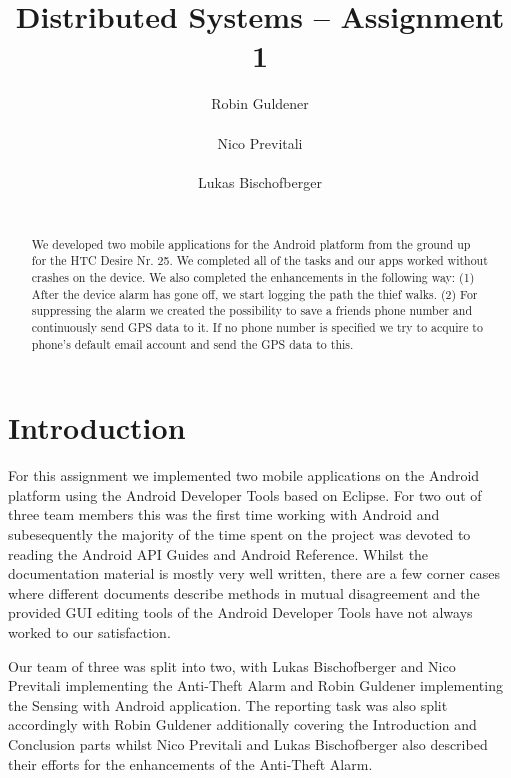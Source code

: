 \documentclass{report}
\title{Distributed Systems -- Assignment 1}
\author{
%
%
\alignauthor Robin Guldener\\
	\affaddr{ETH ID 11-930-369}\\
	\email{robing@student.ethz.ch}
\alignauthor Nico Previtali\\
	\affaddr{ETH ID 11-926-433}\\
	\email{pnico@student.ethz.ch}
\alignauthor Lukas Bischofberger\\
	\affaddr{ETH ID 11-915-907}\\
	\email{lukasbi@student.ethz.ch}
}
\begin{document}
\maketitle

\begin{abstract}

We developed two mobile applications for the Android platform from the ground up for the HTC Desire Nr. 25. We completed all of the tasks and our apps worked without crashes on the device. We also completed the enhancements in the following way: (1) After the device alarm has gone off, we start logging the path the thief walks. (2) For suppressing the alarm we created the possibility to save a friends phone number and continuously send GPS data to it. If no phone number is specified we try to acquire to phone's default email account and send the GPS data to this.

\end{abstract}

\section{Introduction}

For this assignment we implemented two mobile applications on the Android platform using the Android Developer Tools based on Eclipse\cite{androidDevTools}. For two out of three team members this was the first time working with Android and subesequently the majority of the time spent on the project was devoted to reading the Android API Guides\cite{androidAPIGuides} and Android Reference\cite{androidAPIReference}. Whilst the documentation material is mostly very well written, there are a few corner cases where different documents describe methods in mutual disagreement and the provided GUI editing tools of the Android Developer Tools have not always worked to our satisfaction.

Our team of three was split into two, with Lukas Bischofberger and Nico Previtali implementing the Anti-Theft Alarm and Robin Guldener implementing the Sensing with Android application. The reporting task was also split accordingly with Robin Guldener additionally covering the Introduction and Conclusion parts whilst Nico Previtali and Lukas Bischofberger also described their efforts for the enhancements of the Anti-Theft Alarm.
\end{document}
